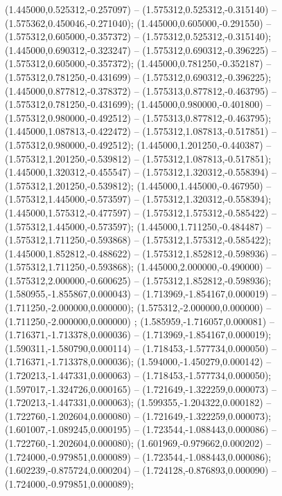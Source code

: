  (1.445000,0.525312,-0.257097) -- (1.575312,0.525312,-0.315140) -- (1.575362,0.450046,-0.271040);
 (1.445000,0.605000,-0.291550) -- (1.575312,0.605000,-0.357372) -- (1.575312,0.525312,-0.315140);
 (1.445000,0.690312,-0.323247) -- (1.575312,0.690312,-0.396225) -- (1.575312,0.605000,-0.357372);
 (1.445000,0.781250,-0.352187) -- (1.575312,0.781250,-0.431699) -- (1.575312,0.690312,-0.396225);
 (1.445000,0.877812,-0.378372) -- (1.575313,0.877812,-0.463795) -- (1.575312,0.781250,-0.431699);
 (1.445000,0.980000,-0.401800) -- (1.575312,0.980000,-0.492512) -- (1.575313,0.877812,-0.463795);
 (1.445000,1.087813,-0.422472) -- (1.575312,1.087813,-0.517851) -- (1.575312,0.980000,-0.492512);
 (1.445000,1.201250,-0.440387) -- (1.575312,1.201250,-0.539812) -- (1.575312,1.087813,-0.517851);
 (1.445000,1.320312,-0.455547) -- (1.575312,1.320312,-0.558394) -- (1.575312,1.201250,-0.539812);
 (1.445000,1.445000,-0.467950) -- (1.575312,1.445000,-0.573597) -- (1.575312,1.320312,-0.558394);
 (1.445000,1.575312,-0.477597) -- (1.575312,1.575312,-0.585422) -- (1.575312,1.445000,-0.573597);
 (1.445000,1.711250,-0.484487) -- (1.575312,1.711250,-0.593868) -- (1.575312,1.575312,-0.585422);
 (1.445000,1.852812,-0.488622) -- (1.575312,1.852812,-0.598936) -- (1.575312,1.711250,-0.593868);
 (1.445000,2.000000,-0.490000) -- (1.575312,2.000000,-0.600625) -- (1.575312,1.852812,-0.598936);
 (1.580955,-1.855867,0.000043) -- (1.713969,-1.854167,0.000019) -- (1.711250,-2.000000,0.000000);
 (1.575312,-2.000000,0.000000) -- (1.711250,-2.000000,0.000000) ;
 (1.585959,-1.716057,0.000081) -- (1.716371,-1.713378,0.000036) -- (1.713969,-1.854167,0.000019);
 (1.590311,-1.580790,0.000114) -- (1.718453,-1.577734,0.000050) -- (1.716371,-1.713378,0.000036);
 (1.594000,-1.450279,0.000142) -- (1.720213,-1.447331,0.000063) -- (1.718453,-1.577734,0.000050);
 (1.597017,-1.324726,0.000165) -- (1.721649,-1.322259,0.000073) -- (1.720213,-1.447331,0.000063);
 (1.599355,-1.204322,0.000182) -- (1.722760,-1.202604,0.000080) -- (1.721649,-1.322259,0.000073);
 (1.601007,-1.089245,0.000195) -- (1.723544,-1.088443,0.000086) -- (1.722760,-1.202604,0.000080);
 (1.601969,-0.979662,0.000202) -- (1.724000,-0.979851,0.000089) -- (1.723544,-1.088443,0.000086);
 (1.602239,-0.875724,0.000204) -- (1.724128,-0.876893,0.000090) -- (1.724000,-0.979851,0.000089);
